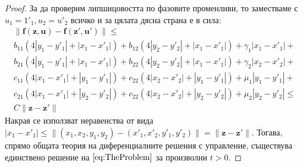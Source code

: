 \begin{proof}
  За да проверим липшицовостта по фазовите променливи, то заместваме с $u_1 = 1'_1, u_2 = u'_2$ всичко и за цялата дясна страна е в сила:
  \begin{multline}
    \|\mathbf{f}(\mathbf{z}, \mathbf{u}) - \mathbf{f}(\mathbf{z}', \mathbf{u}')\| \leq \\
    b_{11} (4 |y_1 - y'_1| + |x_1 - x'_1|) +
    b_{12} (4 |y_2 - y'_2| + |x_1 - x'_1|) + \gamma_1 |x_1-x'_1| + \\
    b_{21} (4 |y_1 - y'_1| + |x_1 - x'_1|) +
    b_{22} (4 |y_2 - y'_2| + |x_1 - x'_1|) + \gamma_2 |x_2-x'_2| + \\
    c_{11} (4 |x_1 - x'_1| + |y_1 - y'_1|) +
    c_{22} (4 |x_2 - x'_2| + |y_1 - y'_1|) + \mu_1 |y_1 - y'_1| + \\
    c_{21} (4 |x_1 - x'_1| + |y_2 - y'_2|) +
    c_{22} (4 |x_2 - x'_2| + |y_2 - y'_2|) + \mu_2 |y_2 - y'_2| \leq \\
    C \|\mathbf{z} - \mathbf{z}'\|
  \end{multline}
  Накрая се използват неравенства от вида $|x_1-x'_1| \leq \|(x_1, x_2, y_1, y_2) - (x'_1, x'_2, y'_1, y'_2)\| = \|\mathbf{z} - \mathbf{z}'\|$.
  Тогава, спрямо общата теория на диференциалните решения с управление, съществува единствено решение на $\eqref{eq:TheProblem}$ за произволни $t>0$.
  \end{proof}

